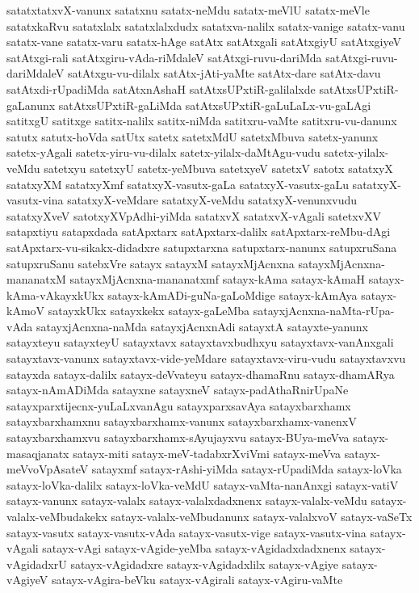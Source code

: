 {satatxtatxvX-vanunx
satatxnu
satatx-neMdu
satatx-meVlU
satatx-meVle
satatxkaRvu
satatxlalx
satatxlalxdudx
satatxva-nalilx
satatx-vanige
satatx-vanu
satatx-vane
satatx-varu
satatx-hAge
satAtx
satAtxgali
satAtxgiyU
satAtxgiyeV
satAtxgi-rali
satAtxgiru-vAda-riMdaleV
satAtxgi-ruvu-dariMda
satAtxgi-ruvu-dariMdaleV
satAtxgu-vu-dilalx
satAtx-jAti-yaMte
satAtx-dare
satAtx-davu
satAtxdi-rUpadiMda
satAtxnAshaH
satAtxsUPxtiR-galilalxde
satAtxsUPxtiR-gaLanunx
satAtxsUPxtiR-gaLiMda
satAtxsUPxtiR-gaLuLaLx-vu-gaLAgi
satitxgU
satitxge
satitx-nalilx
satitx-niMda
satitxru-vaMte
satitxru-vu-danunx
satutx
satutx-hoVda
satUtx
satetx
satetxMdU
satetxMbuva
satetx-yanunx
satetx-yAgali
satetx-yiru-vu-dilalx
satetx-yilalx-daMtAgu-vudu
satetx-yilalx-veMdu
satetxyu
satetxyU
satetx-yeMbuva
satetxyeV
satetxV
satotx
satatxyX
satatxyXM
satatxyXmf
satatxyX-vasutx-gaLa
satatxyX-vasutx-gaLu
satatxyX-vasutx-vina
satatxyX-veMdare
satatxyX-veMdu
satatxyX-venunxvudu
satatxyXveV
satotxyXVpAdhi-yiMda
satatxvX
satatxvX-vAgali
satetxvXV
satapxtiyu
satapxdada
satApxtarx
satApxtarx-dalilx
satApxtarx-reMbu-dAgi
satApxtarx-vu-sikakx-didadxre
satupxtarxna
satupxtarx-nanunx
satupxruSana
satupxruSanu
satebxVre
satayx
satayxM
satayxMjAcnxna
satayxMjAcnxna-mananatxM
satayxMjAcnxna-mananatxmf
satayx-kAma
satayx-kAmaH
satayx-kAma-vAkayxkUkx
satayx-kAmADi-guNa-gaLoMdige
satayx-kAmAya
satayx-kAmoV
satayxkUkx
satayxkekx
satayx-gaLeMba
satayxjAcnxna-naMta-rUpa-vAda
satayxjAcnxna-naMda
satayxjAcnxnAdi
satayxtA
satayxte-yanunx
satayxteyu
satayxteyU
satayxtavx
satayxtavxbudhxyu
satayxtavx-vanAnxgali
satayxtavx-vanunx
satayxtavx-vide-yeMdare
satayxtavx-viru-vudu
satayxtavxvu
satayxda
satayx-dalilx
satayx-deVvateyu
satayx-dhamaRnu
satayx-dhamARya
satayx-nAmADiMda
satayxne
satayxneV
satayx-padAthaRnirUpaNe
satayxparxtijecnx-yuLaLxvanAgu
satayxparxsavAya
satayxbarxhamx
satayxbarxhamxnu
satayxbarxhamx-vanunx
satayxbarxhamx-vanenxV
satayxbarxhamxvu
satayxbarxhamx-sAyujayxvu
satayx-BUya-meVva
satayx-masaqjanatx
satayx-miti
satayx-meV-tadabxrXviVmi
satayx-meVva
satayx-meVvoVpAsateV
satayxmf
satayx-rAshi-yiMda
satayx-rUpadiMda
satayx-loVka
satayx-loVka-dalilx
satayx-loVka-veMdU
satayx-vaMta-nanAnxgi
satayx-vatiV
satayx-vanunx
satayx-valalx
satayx-valalxdadxnenx
satayx-valalx-veMdu
satayx-valalx-veMbudakekx
satayx-valalx-veMbudanunx
satayx-valalxvoV
satayx-vaSeTx
satayx-vasutx
satayx-vasutx-vAda
satayx-vasutx-vige
satayx-vasutx-vina
satayx-vAgali
satayx-vAgi
satayx-vAgide-yeMba
satayx-vAgidadxdadxnenx
satayx-vAgidadxrU
satayx-vAgidadxre
satayx-vAgidadxlilx
satayx-vAgiye
satayx-vAgiyeV
satayx-vAgira-beVku
satayx-vAgirali
satayx-vAgiru-vaMte
}

